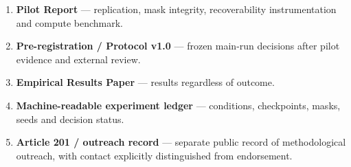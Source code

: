 \begin{enumerate}
\def\labelenumi{\arabic{enumi}.}
\tightlist
\item
  \textbf{Pilot Report} --- replication, mask integrity, recoverability instrumentation and compute benchmark.
\item
  \textbf{Pre-registration / Protocol v1.0} --- frozen main-run decisions after pilot evidence and external review.
\item
  \textbf{Empirical Results Paper} --- results regardless of outcome.
\item
  \textbf{Machine-readable experiment ledger} --- conditions, checkpoints, masks, seeds and decision status.
\item
  \textbf{Article 201 / outreach record} --- separate public record of methodological outreach, with contact explicitly distinguished from endorsement.
\end{enumerate}

